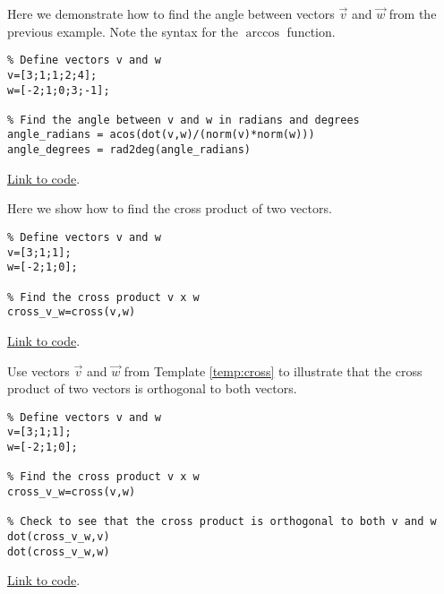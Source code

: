 \documentclass{ximera}
\begin{document}
\begin{example}\label{ex:angleInOctave}
    Here we demonstrate how to find the angle between vectors $\vec{v}$ and $\vec{w}$ from the previous example.  Note the syntax for the $\arccos{}$ function.
    \begin{explanation}
        \begin{verbatim}
% Define vectors v and w
v=[3;1;1;2;4];
w=[-2;1;0;3;-1];

% Find the angle between v and w in radians and degrees
angle_radians = acos(dot(v,w)/(norm(v)*norm(w)))
angle_degrees = rad2deg(angle_radians)
        \end{verbatim}

\href{https://sagecell.sagemath.org/?z=eJxVjM8KAiEQxu-C7zCXBY2WWreb7C16iSXC1mkTSkFFX79pyUPMYfj-_L4OzvhwHqHgkkNMUMB4C5WzMs2jHuiUPl01Z3Wae0XyqEfdD1-Hsw4ujtr5iUStL4Q75oro2wo4D9FYZ3zaDItrREycbe1biyYwS0jChizKvsqD8CG-RZG77VcpZSN-A0QQq0iJvyX5AVWtQWc=&lang=octave&interacts=eJyLjgUAARUAuQ==}{Link to code}.        
    \end{explanation}
\end{example}

\begin{template}\label{temp:cross}
Here we show how to find the cross product of two vectors.
\begin{verbatim}
% Define vectors v and w
v=[3;1;1];
w=[-2;1;0];

% Find the cross product v x w
cross_v_w=cross(v,w)
\end{verbatim}

\href{https://sagecell.sagemath.org/?z=eJxTVXBJTcvMS1UoS00uyS8qVihTSMxLUSjn5SqzjTa2NrQ2jLXm5Sq3jdY1AnIMQBxeLlUFt0ygopKMVIXkovziYoWCovyU0uQSoOYKkFawYHxZfLktmKVRplOuCQBmGSA1&lang=octave&interacts=eJyLjgUAARUAuQ==}{Link to code}.
\end{template}

\begin{example}\label{ex:orthInOctave}
    Use vectors $\vec{v}$ and $\vec{w}$ from Template \ref{temp:cross} to illustrate that the cross product of two vectors is orthogonal to both vectors.
    \begin{explanation}
        \begin{verbatim}
% Define vectors v and w
v=[3;1;1];
w=[-2;1;0];

% Find the cross product v x w
cross_v_w=cross(v,w)

% Check to see that the cross product is orthogonal to both v and w
dot(cross_v_w,v)
dot(cross_v_w,w)
\end{verbatim}

\href{https://sagecell.sagemath.org/?z=eJxtjsEKwjAQRO-B_sNeCg1UsHoMOSn-RJES09UEpSvJmvj5phUUxNvMMG9na9jj2U8ICS1TiJDATCPkSiTdb1WnuqOqRNb9alPMejaVqOHgS4kdgg0UI9wDjQ_LBX7O6BIOach6UU1qs3xzO4f2CkwQEQtv-M8RH4ECO7rQZG5z90Tsvn-NxM1noE3yN8nyBT-BRHk=&lang=octave&interacts=eJyLjgUAARUAuQ==}{Link to code}.
    \end{explanation}
\end{example}

 
\end{document}
